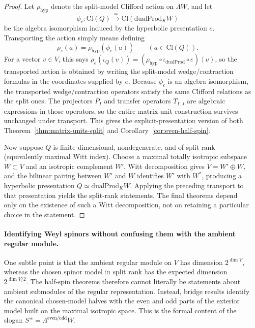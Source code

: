 \documentclass{birkjour}
\theoremstyle{plain}
\theoremstyle{definition}
\theoremstyle{remark}
\newcommand{\Cl}{\mathrm{Cl}}
\newcommand{\dualProd}{\mathrm{dualProd}}
\newcommand{\wedgeW}{\Lambda W}
\begin{document}
\begin{proof}
Let $\rho_{\mathrm{hyp}}$ denote the split-model Clifford action on
$\wedgeW$, and let
\[
  \phi_e:\Cl(Q)\xrightarrow{\ \simeq\ }\Cl(\dualProd_K W)
\]
be the algebra isomorphism induced by the hyperbolic presentation $e$.
Transporting the action simply means defining
\[
  \rho_e(a)=\rho_{\mathrm{hyp}}(\phi_e(a))
  \qquad (a\in \Cl(Q)).
\]
For a vector $v\in V$, this says
\(\rho_e(\iota_Q(v)) = (\rho_{\mathrm{hyp}}\circ \iota_{\dualProd}\circ e)(v)\),
so the transported action is obtained by writing the split-model
wedge/contraction formulas in the coordinates supplied by $e$.
Because $\phi_e$ is an algebra isomorphism, the transported wedge/contraction
operators satisfy the same Clifford relations as the split ones. The
projectors $P_I$ and transfer operators $T_{I,J}$ are algebraic expressions in
those operators, so the entire matrix-unit construction survives unchanged
under transport. This gives the explicit-presentation version of both
Theorem~\ref{thm:matrix-units-split} and
Corollary~\ref{cor:even-half-spin}.

Now suppose $Q$ is finite-dimensional, nondegenerate, and of split rank
(equivalently maximal Witt index). Choose a maximal totally isotropic subspace $W\subset V$ and an
isotropic complement $W'$. Witt decomposition gives
$V=W'\oplus W$, and the bilinear pairing between $W'$ and $W$ identifies
$W'$ with $W^*$, producing a hyperbolic presentation
$Q\simeq \dualProd_K W$. Applying the preceding transport to that presentation
yields the split-rank statements. The final theorems depend only on the
existence of such a Witt decomposition, not on retaining a particular choice in
the statement.
\end{proof}

\paragraph{Identifying Weyl spinors without confusing them with the ambient
regular module.}
One subtle point is that the ambient regular module on $V$ has dimension
$2^{\dim V}$, whereas the chosen spinor model in split rank has the expected
dimension $2^{\dim V/2}$. The half-spin theorems therefore cannot literally be
statements about ambient submodules of the regular representation. Instead,
bridge results identify the canonical chosen-model halves with the even and odd
parts of the exterior model built on the maximal isotropic space. This is the
formal content of the slogan
$S^{\pm} = \Lambda^{\mathrm{even}/\mathrm{odd}} W$.
\end{document}
